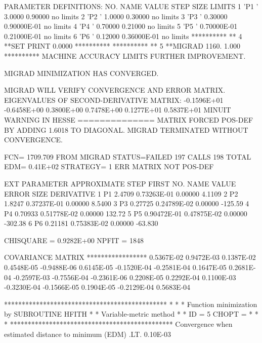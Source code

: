 \begin{Listing}
{ PARAMETER DEFINITIONS:
    NO.   NAME         VALUE      STEP SIZE      LIMITS
     1 'P1        '    3.0000      0.90000         no limits
     2 'P2        '    1.0000      0.30000         no limits
     3 'P3        '   0.30000      0.90000E-01     no limits
     4 'P4        '   0.70000      0.21000         no limits
     5 'P5        '   0.70000E-01  0.21000E-01     no limits
     6 'P6        '   0.12000      0.36000E-01     no limits
 **********
 **    4 **SET PRINT  0.0000    
 **********
 **********
 **    5 **MIGRAD   1160.       1.000    
 **********
 MACHINE ACCURACY LIMITS FURTHER IMPROVEMENT.

 MIGRAD MINIMIZATION HAS CONVERGED.

 MIGRAD WILL VERIFY CONVERGENCE AND ERROR MATRIX.
 EIGENVALUES OF SECOND-DERIVATIVE MATRIX:
        -0.1596E+01 -0.6458E+00  0.3800E+00  0.7478E+00  0.1277E+01  0.5837E+01
 MINUIT WARNING IN HESSE   
 ============== MATRIX FORCED POS-DEF BY ADDING   1.6018     TO DIAGONAL.
 MIGRAD TERMINATED WITHOUT CONVERGENCE.

 FCN=   1709.709     FROM MIGRAD    STATUS=FAILED       197 CALLS      198 TOTAL
                     EDM=  0.41E+02    STRATEGY= 1      ERR MATRIX NOT POS-DEF

  EXT PARAMETER                APPROXIMATE        STEP         FIRST   
  NO.   NAME        VALUE          ERROR          SIZE      DERIVATIVE 
   1      P1        2.4709       0.73263E-01   0.00000        4.1109    
   2      P2        1.8247       0.37237E-01   0.00000        8.5400    
   3      P3       0.27725       0.24789E-02   0.00000       -125.59    
   4      P4       0.70933       0.51778E-02   0.00000        132.72    
   5      P5       0.90472E-01   0.47875E-02   0.00000       -302.38    
   6      P6       0.21181       0.75383E-02   0.00000       -63.830    

 CHISQUARE = 0.9282E+00  NPFIT = 1848

  COVARIANCE MATRIX
  *****************
  0.5367E-02 
  0.9472E-03   0.1387E-02 
  0.4548E-05  -0.9488E-06   0.6145E-05 
 -0.1520E-04  -0.2581E-04   0.1647E-05   0.2681E-04 
 -0.2597E-03  -0.7556E-04  -0.2361E-06   0.2208E-05   0.2292E-04 
  0.1100E-03  -0.3230E-04  -0.1566E-05   0.1904E-05  -0.2129E-04   0.5683E-04 

     **********************************************
     *                                            *
     * Function minimization by SUBROUTINE HFITH  *
     * Variable-metric method                     *
     * ID =          5  CHOPT =                   *
     *                                            *
     **********************************************
 Convergence when estimated distance to minimum (EDM) .LT.  0.10E-03

}
\end{Listing}
